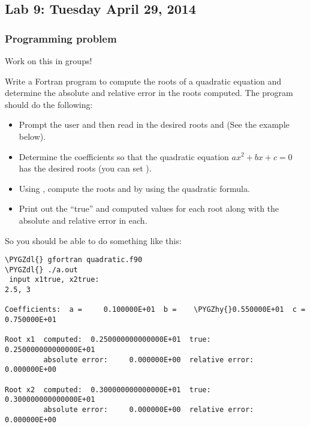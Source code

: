 \documentclass[letterpaper,10pt,english]{sphinxmanual}
\def\PYGZdl{\char`\$}
\def\PYGZhy{\char`\-}
\begin{document}
\subsection{Lab 9: Tuesday April 29, 2014}
\label{labs/lab9:lab9}\label{labs/lab9::doc}\label{labs/lab9:lab-9-tuesday-april-29-2014}

\subsubsection{Programming problem}
\label{labs/lab9:programming-problem}
Work on this in groups!

Write a Fortran program to compute the roots of a quadratic equation and
determine the absolute and relative error in the roots computed.  The
program should do the following:
\begin{itemize}
\item {} 
Prompt the user and then read in the desired roots  and 
(See the example below).

\item {} 
Determine the coefficients  so that the quadratic equation
\(a x^2 + bx + c =0\) has the desired roots (you can set ).

\item {} 
Using , compute the roots  and  by using the quadratic
formula.

\item {} 
Print out the ``true'' and computed values for each root along with the
absolute and relative error in each.

\end{itemize}

So you should be able to do something like this:

\begin{Verbatim}[commandchars=\\\{\}]
\PYGZdl{} gfortran quadratic.f90
\PYGZdl{} ./a.out
 input x1true, x2true:
2.5, 3

Coefficients:  a =     0.100000E+01  b =    \PYGZhy{}0.550000E+01  c = 0.750000E+01

Root x1  computed:  0.250000000000000E+01  true:  0.250000000000000E+01
         absolute error:     0.000000E+00  relative error:     0.000000E+00

Root x2  computed:  0.300000000000000E+01  true:  0.300000000000000E+01
         absolute error:     0.000000E+00  relative error:     0.000000E+00
\end{Verbatim}
\end{document}
